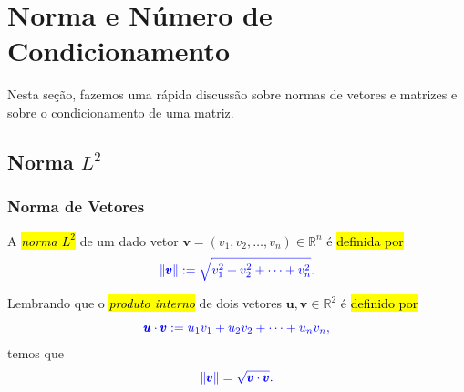 \section{Norma e Número de Condicionamento}\label{cap_sislin_sec_ncond}

Nesta seção, fazemos uma rápida discussão sobre normas de vetores e matrizes e sobre o condicionamento de uma matriz.

\subsection{Norma $L^2$}

\subsubsection{Norma de Vetores}

A \hl{\emph{norma $L^2$}} de um dado vetor $\pmb{v} = (v_1, v_2, \dotsc, v_n) \in \mathbb{R}^n$ é \hl{definida por}
\begin{equation}\color{blue}\|\pmb{v}\| := \sqrt{v_1^2 + v_2^2 + \cdots + v_n^2}.
\end{equation}

Lembrando que o \hl{\emph{produto interno}} de dois vetores $\pmb{u},\pmb{v}\in\mathbb{R}^2$ é \hl{definido por}
\begin{equation}\color{blue}\pmb{u}\cdot\pmb{v} := u_1v_1 + u_2v_2 + \cdots + u_nv_n,
\end{equation}
temos que
\begin{equation}\color{blue}\|\pmb{v}\| = \sqrt{\pmb{v}\cdot\pmb{v}}.
\end{equation}


